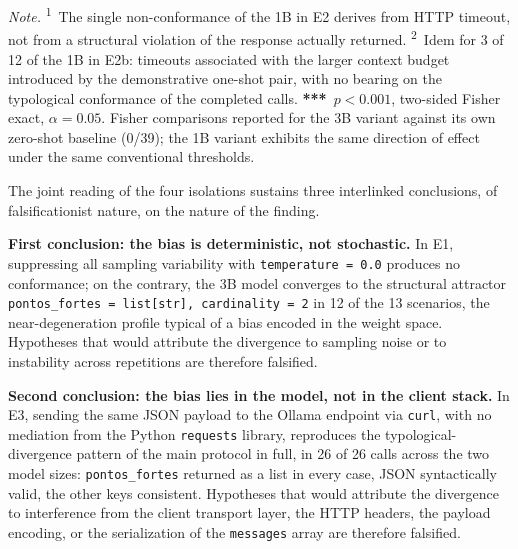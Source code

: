 \documentclass{sbc2023}%
\begin{document}
\noindent\textit{Note.} \textsuperscript{1}~The single non-conformance of the 1B in E2 derives from HTTP timeout, not from a structural violation of the response actually returned. \textsuperscript{2}~Idem for 3 of 12 of the 1B in E2b: timeouts associated with the larger context budget introduced by the demonstrative one-shot pair, with no bearing on the typological conformance of the completed calls. \textbf{***}~$p<0.001$, two-sided Fisher exact, $\alpha=0.05$. Fisher comparisons reported for the 3B variant against its own zero-shot baseline (0/39); the 1B variant exhibits the same direction of effect under the same conventional thresholds.

The joint reading of the four isolations sustains three interlinked conclusions, of falsificationist nature, on the nature of the finding.

\textbf{First conclusion: the bias is deterministic, not stochastic.} In E1, suppressing all sampling variability with \texttt{temperature = 0.0} produces no conformance; on the contrary, the 3B model converges to the structural attractor \texttt{pontos\_fortes = list[str], cardinality = 2} in 12 of the 13 scenarios, the near-degeneration profile typical of a bias encoded in the weight space. Hypotheses that would attribute the divergence to sampling noise or to instability across repetitions are therefore falsified.

\textbf{Second conclusion: the bias lies in the model, not in the client stack.} In E3, sending the same JSON payload to the Ollama endpoint via \texttt{curl}, with no mediation from the Python \texttt{requests} library, reproduces the typological-divergence pattern of the main protocol in full, in 26 of 26 calls across the two model sizes: \texttt{pontos\_fortes} returned as a list in every case, JSON syntactically valid, the other keys consistent. Hypotheses that would attribute the divergence to interference from the client transport layer, the HTTP headers, the payload encoding, or the serialization of the \texttt{messages} array are therefore falsified.
\end{document}
